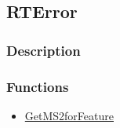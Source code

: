 \subsection{RTError}\label{RTError}
\subsubsection{Description}


\subsubsection{Functions}
\begin{itemize}
\item \hyperref[GetMS2forFeature]{GetMS2forFeature}
\end{itemize}

